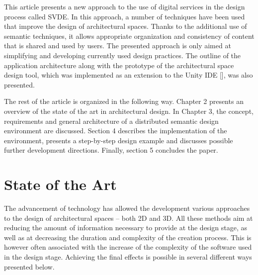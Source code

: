 \documentclass[runningheads]{llncs}
\begin{document}
This article presents a new approach to the use of digital services in the design process called SVDE. In this approach, a number of techniques have been used that improve the design of architectural spaces. Thanks to the additional use of semantic techniques, it allows appropriate organization and consistency of content that is shared and used by users. The presented approach is only aimed at simplifying and developing currently used design practices. The outline of the application architecture along with the prototype of the architectural space design tool, which was implemented as an extension to the Unity IDE [], was also presented.

The rest of the article is organized in the following way. Chapter 2 presents an overview of the state of the art in architectural design. In Chapter 3, the concept, requirements and general architecture of a distributed semantic design environment are discussed. Section 4 describes the implementation of the environment, presents a step-by-step design example and discusses possible further development directions.
Finally, section 5 concludes the paper.

\section{State of the Art}
The advancement of technology has allowed the development various approaches to the design of architectural spaces – both 2D and 3D. All these methods aim at reducing the amount of information necessary to provide at the design stage, as well as at decreasing the duration and complexity of the creation process. This is however often associated with the increase of the complexity of the software used in the design stage. Achieving the final effects is possible in several different ways presented below.
\end{document}
